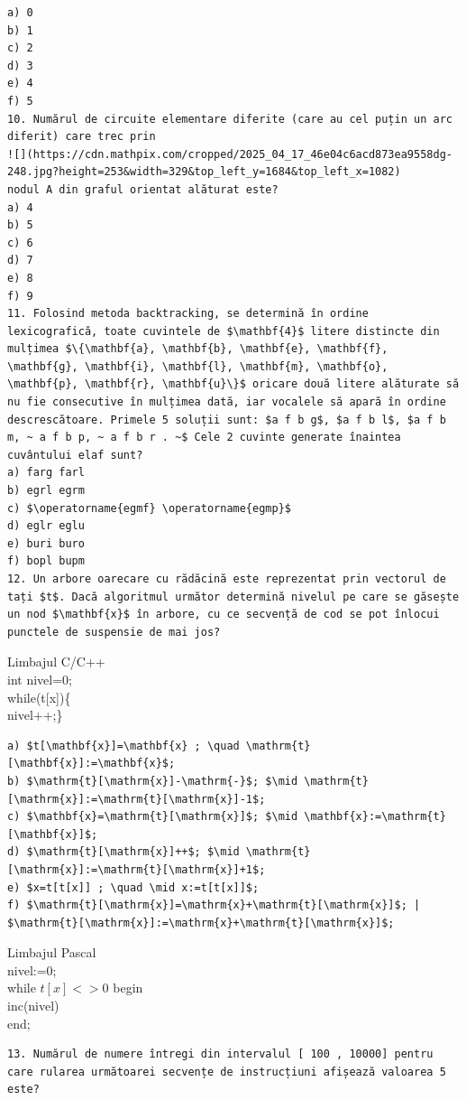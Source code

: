 \documentclass[10pt]{article}
\begin{document}
\begin{verbatim}
a) 0
b) 1
c) 2
d) 3
e) 4
f) 5
10. Numărul de circuite elementare diferite (care au cel puțin un arc diferit) care trec prin
![](https://cdn.mathpix.com/cropped/2025_04_17_46e04c6acd873ea9558dg-248.jpg?height=253&width=329&top_left_y=1684&top_left_x=1082)
nodul A din graful orientat alăturat este?
a) 4
b) 5
c) 6
d) 7
e) 8
f) 9
11. Folosind metoda backtracking, se determină în ordine lexicografică, toate cuvintele de $\mathbf{4}$ litere distincte din mulțimea $\{\mathbf{a}, \mathbf{b}, \mathbf{e}, \mathbf{f}, \mathbf{g}, \mathbf{i}, \mathbf{l}, \mathbf{m}, \mathbf{o}, \mathbf{p}, \mathbf{r}, \mathbf{u}\}$ oricare două litere alăturate să nu fie consecutive în mulțimea dată, iar vocalele să apară în ordine descrescătoare. Primele 5 soluții sunt: $a f b g$, $a f b l$, $a f b m, ~ a f b p, ~ a f b r . ~$ Cele 2 cuvinte generate înaintea cuvântului elaf sunt?
a) farg farl
b) egrl egrm
c) $\operatorname{egmf} \operatorname{egmp}$
d) eglr eglu
e) buri buro
f) bopl bupm
12. Un arbore oarecare cu rădăcină este reprezentat prin vectorul de tați $t$. Dacă algoritmul următor determină nivelul pe care se găsește un nod $\mathbf{x}$ în arbore, cu ce secvență de cod se pot înlocui punctele de suspensie de mai jos?
\end{verbatim}

Limbajul C/C++\\
int nivel=0;\\[0pt]
while(t[x])\{\\
nivel++;\}

\begin{verbatim}
a) $t[\mathbf{x}]=\mathbf{x} ; \quad \mathrm{t}[\mathbf{x}]:=\mathbf{x}$;
b) $\mathrm{t}[\mathrm{x}]-\mathrm{-}$; $\mid \mathrm{t}[\mathrm{x}]:=\mathrm{t}[\mathrm{x}]-1$;
c) $\mathbf{x}=\mathrm{t}[\mathrm{x}]$; $\mid \mathbf{x}:=\mathrm{t}[\mathbf{x}]$;
d) $\mathrm{t}[\mathrm{x}]++$; $\mid \mathrm{t}[\mathrm{x}]:=\mathrm{t}[\mathrm{x}]+1$;
e) $x=t[t[x]] ; \quad \mid x:=t[t[x]]$;
f) $\mathrm{t}[\mathrm{x}]=\mathrm{x}+\mathrm{t}[\mathrm{x}]$; | $\mathrm{t}[\mathrm{x}]:=\mathrm{x}+\mathrm{t}[\mathrm{x}]$;
\end{verbatim}

Limbajul Pascal\\
nivel:=0;\\
while $t[x]<>0$ begin\\
inc(nivel)\\
end;

\begin{verbatim}
13. Numărul de numere întregi din intervalul [ 100 , 10000] pentru care rularea următoarei secvențe de instrucțiuni afișează valoarea 5 este?
\end{verbatim}
\end{document}
